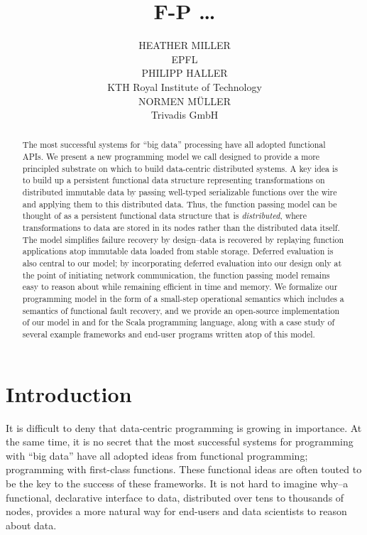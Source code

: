 \documentclass{jfp1}
\title[Journal of Functional Programming]{F-P \dots\todo{Title}}
\author[H. Miller, P. Haller and N. M{\"u}ller]{%
  HEATHER MILLER\\ EPFL\\[1ex]%
  PHILIPP HALLER\\ KTH Royal Institute of Technology\\[1ex]%
  NORMEN M{\"U}LLER\\ Trivadis GmbH}%
\begin{document}
\label{firstpage}

\maketitle

\begin{abstract}
  The most successful systems for ``big data'' processing have all adopted
  functional APIs. We present a new programming model we call {\FP} designed to
  provide a more principled substrate on which to build data-centric distributed
  systems. A key idea is to build up a persistent functional data structure
  representing transformations on distributed immutable data by passing
  well-typed serializable functions over the wire and applying them to this
  distributed data. Thus, the function passing model can be thought of as a
  persistent functional data structure that is {\em distributed}, where
  transformations to data are stored in its nodes rather than the distributed
  data itself. The model simplifies failure recovery by design--data is
  recovered by replaying function applications atop immutable data loaded from
  stable storage. Deferred evaluation is also central to our model; by
  incorporating deferred evaluation into our design only at the point of
  initiating network communication, the function passing model remains easy to
  reason about while remaining efficient in time and memory. We formalize our
  programming model in the form of a small-step operational semantics which
  includes a semantics of functional fault recovery, and we provide an
  open-source implementation of our model in and for the Scala programming
  language, along with a case study of several example frameworks and end-user
  programs written atop of this model.
\end{abstract}

\tableofcontents

\section{Introduction}

It is difficult to deny that data-centric programming is growing in importance.
At the same time, it is no secret that the most successful systems for
programming with ``big data'' have all adopted ideas from functional
programming; \ie programming with first-class functions. These functional ideas
are often touted to be the key to the success of these frameworks. It is not
hard to imagine why--a functional, declarative interface to data, distributed
over tens to thousands of nodes, provides a more natural way for end-users and
data scientists to reason about data.
\end{document}
